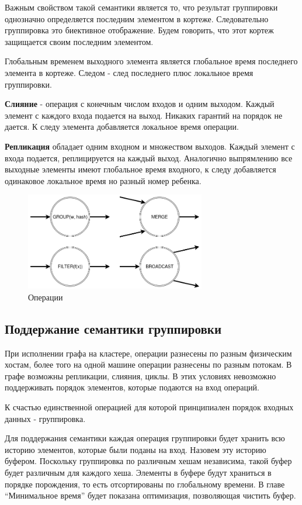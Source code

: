 \documentclass[14pt]{matmex-diploma-custom}
\begin{document}
Важным свойством такой семантики является то, что результат группировки однозначно определяется последним элементом в кортеже. Следовательно группировка это биективное отображение. Будем говорить, что этот кортеж защищается своим последним элементом.

Глобальным временем выходного элемента является глобальное время последнего элемента в кортеже. Следом - след последнего плюс локальное время группировки.

\textbf{Слияние} - операция с конечным числом входов и одним выходом. Каждый элемент с каждого входа подается на выход. Никаких гарантий на порядок не дается. К следу элемента добавляется локальное время операции.

\textbf{Репликация} обладает одним входном и множеством выходов.  Каждый элемент с входа подается, реплицируется на каждый выход. Аналогично выпрямлению все выходные элементы имеют глобальное время входного, к следу добавляется одинаковое локальное время но разный номер ребенка.

\begin{figure}
  \centering
	\includegraphics[width=0.7\textwidth]{pics/ops.png}
	\caption{Операции}
\end{figure}

\subsection{Поддержание семантики группировки}

При исполнении графа на кластере, операции разнесены по разным физическим хостам, более того на одной машине операции разнесены по разным потокам. В графе возможны репликации, слияния, циклы. В этих условиях невозможно поддерживать порядок элементов, которые подаются на вход операций.

К счастью единственной операцией для которой принципиален порядок входных данных - группировка.

Для поддержания семантики каждая операция группировки будет хранить всю историю элементов, которые были поданы на вход. Назовем эту историю буфером. Поскольку группировка по различным хешам независима, такой буфер будет различным для каждого хеша. Элементы в буфере будут храниться в порядке порождения, то есть отсортированы по глобальному времени. В главе “Минимальное время” будет показана оптимизация, позволяющая чистить буфер.
\end{document}
